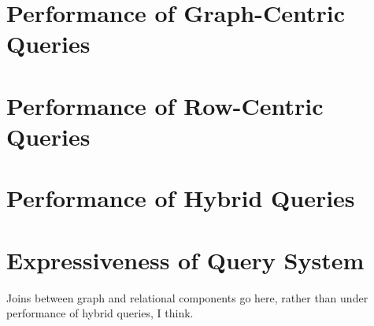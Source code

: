 
\section{Performance of Graph-Centric Queries}
\section{Performance of Row-Centric Queries}
\section{Performance of Hybrid Queries}
\section{Expressiveness of Query System}

Joins between graph and relational components go here, rather than under performance of hybrid queries, I think.

